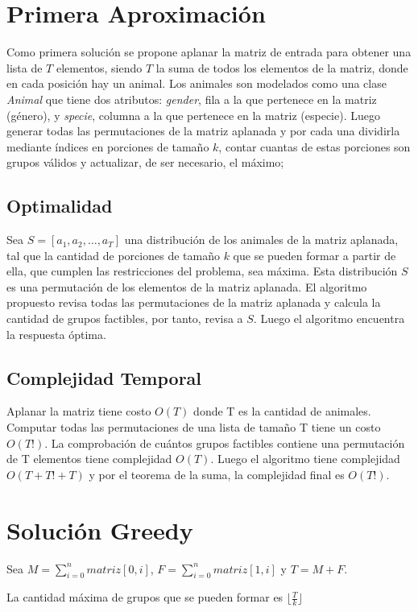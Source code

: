 \documentclass[article]{llncs}
\begin{document}
\section{Primera Aproximaci\'on}

Como primera soluci\'on se propone aplanar la matriz de entrada para 
obtener una lista de $T$ elementos, siendo $T$ la suma de todos los elementos de la matriz,
 donde en cada posici\'on hay un animal. 
Los animales son modelados como una clase \emph{Animal} que tiene dos 
atributos: \emph{gender}, fila a la que pertenece en la matriz (g\'enero),  
y \emph{specie}, columna a la que pertenece en la matriz (especie). Luego 
generar todas las permutaciones de la matriz aplanada y por cada una 
dividirla mediante \'indices en porciones de tamaño $k$, contar cuantas 
de estas porciones son grupos v\'alidos y actualizar, de ser necesario, el 
máximo;   

\subsection{Optimalidad}
Sea $S = [a_1, a_2, \dots, a_T]$ una distribución de los animales de la 
matriz aplanada, tal que la cantidad de porciones de tamaño $k$ que se pueden 
formar a partir de ella, que cumplen las restricciones del problema, sea máxima. 
Esta distribución $S$ es una permutación de los elementos de la matriz aplanada. 
El algoritmo propuesto revisa todas las permutaciones de la matriz aplanada y 
calcula la cantidad de grupos factibles, por tanto, revisa a $S$. Luego 
el algoritmo encuentra la respuesta óptima.

\subsection{Complejidad Temporal}

Aplanar la matriz tiene costo $O(T)$ donde T es la cantidad 
de animales. Computar todas las permutaciones de una lista 
de tamaño T tiene un costo $O(T!)$. La comprobación 
de cuántos grupos factibles contiene una permutación de T 
elementos tiene complejidad $O(T)$. Luego el algoritmo 
tiene complejidad $O(T + T! + T)$ y por el teorema de la 
suma, la complejidad final es $O(T!)$.

\section{Solución Greedy}

Sea $M = \sum_{i=0}^{n}matriz[0, i]$, $F = \sum_{i=0}^{n}matriz[1, i]$ y 
$T = M + F$.

La cantidad máxima de grupos que se pueden formar es $\lfloor \frac{T}{k} \rfloor$
\end{document}
